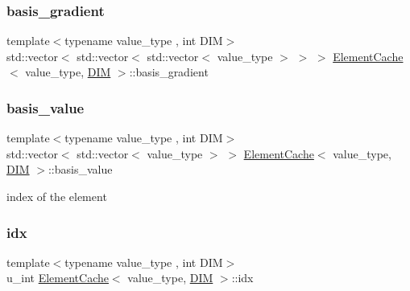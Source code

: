 \subsubsection{\texorpdfstring{basis\+\_\+gradient}{basis\_gradient}}
{\footnotesize\ttfamily template$<$typename value\+\_\+type , int D\+IM$>$ \\
std\+::vector$<$ std\+::vector$<$ std\+::vector$<$ value\+\_\+type $>$ $>$ $>$ \mbox{\hyperlink{struct_element_cache}{Element\+Cache}}$<$ value\+\_\+type, \mbox{\hyperlink{complex__node___t_h_f_e_m_2uiexp_8h_a589b8b9bfdf714f736059845d568b597}{D\+IM}} $>$\+::basis\+\_\+gradient}

\mbox{\label{struct_element_cache_a31bc1cb436c3deb1c9aa8dad78c51a31}} 
\subsubsection{\texorpdfstring{basis\+\_\+value}{basis\_value}}
{\footnotesize\ttfamily template$<$typename value\+\_\+type , int D\+IM$>$ \\
std\+::vector$<$ std\+::vector$<$ value\+\_\+type $>$ $>$ \mbox{\hyperlink{struct_element_cache}{Element\+Cache}}$<$ value\+\_\+type, \mbox{\hyperlink{complex__node___t_h_f_e_m_2uiexp_8h_a589b8b9bfdf714f736059845d568b597}{D\+IM}} $>$\+::basis\+\_\+value}



index of the element 

\mbox{\label{struct_element_cache_a9f765d8abac7e3b3bb20426574404932}} 
\subsubsection{\texorpdfstring{idx}{idx}}
{\footnotesize\ttfamily template$<$typename value\+\_\+type , int D\+IM$>$ \\
u\+\_\+int \mbox{\hyperlink{struct_element_cache}{Element\+Cache}}$<$ value\+\_\+type, \mbox{\hyperlink{complex__node___t_h_f_e_m_2uiexp_8h_a589b8b9bfdf714f736059845d568b597}{D\+IM}} $>$\+::idx}

\mbox{\label{struct_element_cache_a285c8c9426673f094eda9254a54d358a}} 
